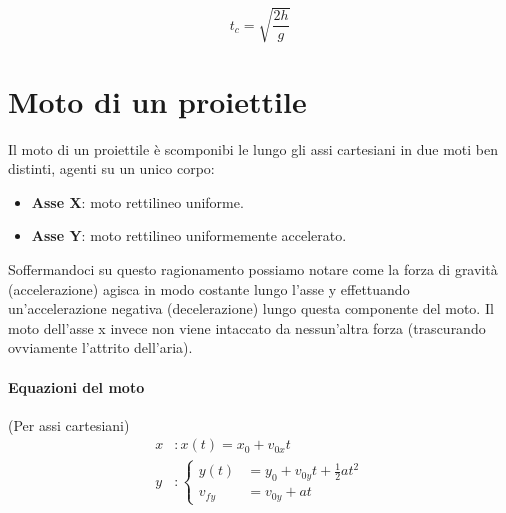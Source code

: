             \begin{equation}
                t_c=\sqrt{\frac{2h}{g}}
            \end{equation}

    \section{Moto di un proiettile} 

        Il moto di un proiettile è scomponibi le lungo gli assi cartesiani in 
        due moti ben distinti, agenti su un unico corpo:
        \begin{itemize}
            \item \textbf{Asse X}: moto rettilineo uniforme.
            \item \textbf{Asse Y}: moto rettilineo uniformemente accelerato.
        \end{itemize}
        Soffermandoci su questo ragionamento possiamo notare come la forza di 
        gravità (accelerazione) agisca in modo costante lungo l'asse y 
        effettuando un'accelerazione negativa (decelerazione) lungo questa 
        componente del moto. Il moto dell'asse x invece non viene intaccato da 
        nessun'altra forza (trascurando ovviamente l'attrito dell'aria).
        
        \paragraph{Equazioni del moto}
        (Per assi cartesiani)
        \begin{align}
            x &: x(t) = x_0 + v_{0x}t \\
            y &: \begin{cases}
                    y(t) &= y_0 + v_{0y}t + \frac{1}{2}at^2 \\
                    v_{fy} &= v_{0y} + at
                \end{cases}
        \end{align}

